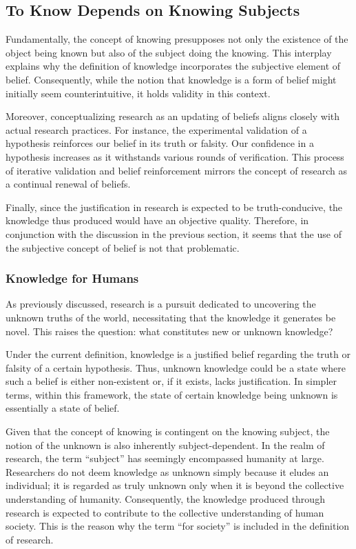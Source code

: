 \documentclass{article}
\begin{document}
\subsection{To Know Depends on Knowing Subjects}

Fundamentally, the concept of knowing presupposes not only the existence of the object being known but also of the subject doing the knowing. This interplay explains why the definition of knowledge incorporates the subjective element of belief. Consequently, while the notion that knowledge is a form of belief might initially seem counterintuitive, it holds validity in this context. 

Moreover, conceptualizing research as an updating of beliefs aligns closely with actual research practices. For instance, the experimental validation of a hypothesis reinforces our belief in its truth or falsity. Our confidence in a hypothesis increases as it withstands various rounds of verification. This process of iterative validation and belief reinforcement mirrors the concept of research as a continual renewal of beliefs.

Finally, since the justification in research is expected to be truth-conducive, the knowledge thus produced would have an objective quality. Therefore, in conjunction with the discussion in the previous section, it seems that the use of the subjective concept of belief is not that problematic.

\subsubsection{Knowledge for Humans}
As previously discussed, research is a pursuit dedicated to uncovering the unknown truths of the world, necessitating that the knowledge it generates be novel. This raises the question: what constitutes new or unknown knowledge?

Under the current definition, knowledge is a justified belief regarding the truth or falsity of a certain hypothesis. Thus, unknown knowledge could be a state where such a belief is either non-existent or, if it exists, lacks justification. In simpler terms, within this framework, the state of certain knowledge being unknown is essentially a state of belief.

Given that the concept of knowing is contingent on the knowing subject, the notion of the unknown is also inherently subject-dependent. In the realm of research, the term ``subject'' has seemingly encompassed humanity at large. Researchers do not deem knowledge as unknown simply because it eludes an individual; it is regarded as truly unknown only when it is beyond the collective understanding of humanity. Consequently, the knowledge produced through research is expected to contribute to the collective understanding of human society. This is the reason why the term ``for society'' is included in the definition of research.
\end{document}
